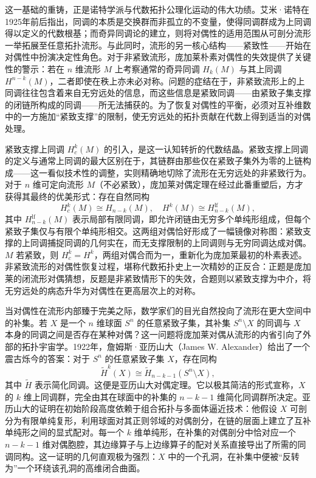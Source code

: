 \documentclass[12pt,a4paper]{article}
\begin{document}
这一基础的重铸，正是诺特学派与代数拓扑公理化运动的伟大功绩。艾米·诺特在1925年前后指出，同调的本质是交换群而非孤立的不变量，使得同调群成为上同调得以定义的代数根基；而奇异同调论的建立，则将对偶性的适用范围从可剖分流形一举拓展至任意拓扑流形。与此同时，流形的另一核心结构——紧致性——开始在对偶性中扮演决定性角色。对于非紧致流形，庞加莱朴素对偶性的失效提供了关键性的警示：若在 $n$ 维流形 $M$ 上考察通常的奇异同调 $H_k(M)$ 与其上同调 $H^{n-k}(M)$，二者即使在秩上亦未必对称。问题的症结在于，非紧致流形上的上同调往往包含着来自无穷远处的信息，而这些信息是紧致同调——由紧致子集支撑的闭链所构成的同调——所无法捕获的。为了恢复对偶性的平衡，必须对互补维数中的一方施加“紧致支撑”的限制，使无穷远处的拓扑贡献在代数上得到适当的对偶处理。

紧致支撑上同调 $H^k_c(M)$ 的引入，是这一认知转折的代数结晶。紧致支撑上同调的定义与通常上同调的最大区别在于，其链群由那些仅在紧致子集外为零的上链构成——这一看似技术性的调整，实则精确地切除了流形在无穷远处的非紧致行为。对于 $n$ 维可定向流形 $M$（不必紧致），庞加莱对偶定理在经过此番重塑后，方才获得其最终的优美形式：存在自然同构
$$
H^k_c(M) \cong H_{n-k}(M), \quad H^k(M) \cong H_{n-k}^\text{lf}(M),
$$
其中 $H_{n-k}^\text{lf}(M)$ 表示局部有限同调，即允许闭链由无穷多个单纯形组成，但每个紧致子集仅与有限个单纯形相交。这两组对偶恰好形成了一幅镜像对称图：紧致支撑的上同调捕捉同调的几何实在，而无支撑限制的上同调则与无穷同调达成对偶。$M$ 若紧致，则 $H^k_c = H^k$，两组对偶合而为一，重新化为庞加莱最初的朴素表述。非紧致流形的对偶性恢复过程，堪称代数拓扑史上一次精妙的正反合：正题是庞加莱的闭流形对偶猜想，反题是非紧致情形下的失效，合题则以紧致支撑为中介，将无穷远处的病态升华为对偶性在更高层次上的对称。

当对偶性在流形内部臻于完美之际，数学家们的目光自然投向了流形在更大空间中的补集。若 $X$ 是一个 $n$ 维球面 $S^n$ 的任意紧致子集，其补集 $S^n \setminus X$ 的同调与 $X$ 本身的同调之间是否存在某种对偶？这一问题将庞加莱对偶从流形的内省引向了外部的拓扑宇宙学。1922年，詹姆斯·亚历山大（James W. Alexander）给出了一个震古烁今的答案：对于 $S^n$ 的任意紧致子集 $X$，存在同构
$$
\tilde{H}^k(X) \cong \tilde{H}_{n-k-1}(S^n \setminus X),
$$
其中 $\tilde{H}$ 表示简化同调。这便是亚历山大对偶定理。它以极其简洁的形式宣称，$X$ 的 $k$ 维上同调群，完全由其在球面中的补集的 $n-k-1$ 维简化同调群所决定。亚历山大的证明在初始阶段高度依赖于组合拓扑与多面体逼近技术：他假设 $X$ 可剖分为有限单纯复形，利用球面对其正则邻域的对偶剖分，在链的层面上建立了互补单纯形之间的显式配对。每一个 $k$ 维单纯形，在补集的对偶剖分中恰对应一个 $n-k-1$ 维对偶胞腔，其边缘算子与上边缘算子的配对关系直接导出了所需的同调同构。这一证明的几何直观极为强烈：$X$ 中的一个孔洞，在补集中便被“反转为”一个环绕该孔洞的高维闭合曲面。
\end{document}
